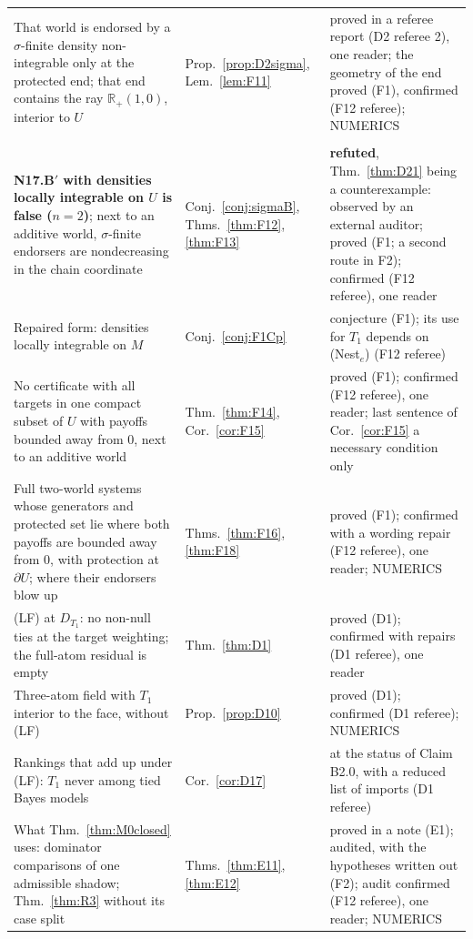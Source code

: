 \documentclass[11pt]{article}
\theoremstyle{definition}
\theoremstyle{remark}
\newcommand{\R}{\mathbb R}
\begin{document}
{\begin{longtable}{>{\raggedright\arraybackslash}p{6.4cm}>{\raggedright\arraybackslash}p{2.1cm}>{\raggedright\arraybackslash}p{5.6cm}}
That world is endorsed by a $\sigma$-finite density non-integrable only at the protected end; that end contains the ray $\R_+(1,0)$, interior to $U$ & Prop.~\ref{prop:D2sigma}, Lem.~\ref{lem:F11} & proved in a referee report (D2 referee 2), one reader; the geometry of the end proved (F1), confirmed (F12 referee); NUMERICS\\
\multicolumn{3}{l}{\emph{Audit of 15 October} (\S\ref{sec:open-core}(e), (f); notes F1, F2, refereed once in F12 referee)}\\
\textbf{N17.B$'$ with densities locally integrable on $U$ is false ($n=2$)}; next to an additive world, $\sigma$-finite endorsers are nondecreasing in the chain coordinate & Conj.~\ref{conj:sigmaB}, Thms.~\ref{thm:F12}, \ref{thm:F13} & \textbf{refuted}, Thm.~\ref{thm:D21} being a counterexample: observed by an external auditor; proved (F1; a second route in F2); confirmed (F12 referee), one reader\\
Repaired form: densities locally integrable on $M$ & Conj.~\ref{conj:F1Cp} & conjecture (F1); its use for $T_1$ depends on (Nest$_e$) (F12 referee)\\
No certificate with all targets in one compact subset of $U$ with payoffs bounded away from $0$, next to an additive world & Thm.~\ref{thm:F14}, Cor.~\ref{cor:F15} & proved (F1); confirmed (F12 referee), one reader; last sentence of Cor.~\ref{cor:F15} a necessary condition only\\
Full two-world systems whose generators and protected set lie where both payoffs are bounded away from $0$, with protection at $\partial U$; where their endorsers blow up & Thms.~\ref{thm:F16}, \ref{thm:F18} & proved (F1); confirmed with a wording repair (F12 referee), one reader; NUMERICS\\
(LF) at $D_{T_1}$: no non-null ties at the target weighting; the full-atom residual is empty & Thm.~\ref{thm:D1} & proved (D1); confirmed with repairs (D1 referee), one reader\\
Three-atom field with $T_1$ interior to the face, without (LF) & Prop.~\ref{prop:D10} & proved (D1); confirmed (D1 referee); NUMERICS\\
Rankings that add up under (LF): $T_1$ never among tied Bayes models & Cor.~\ref{cor:D17} & at the status of Claim B2.0, with a reduced list of imports (D1 referee)\\
What Thm.~\ref{thm:M0closed} uses: dominator comparisons of one admissible shadow; Thm.~\ref{thm:R3} without its case split & Thms.~\ref{thm:E11}, \ref{thm:E12} & proved in a note (E1); audited, with the hypotheses written out (F2); audit confirmed (F12 referee), one reader; NUMERICS\\

\end{longtable}}
\end{document}
